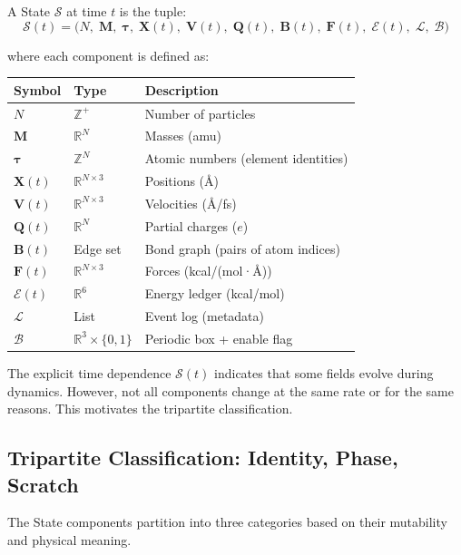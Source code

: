 \documentclass[11pt]{article}
\begin{document}
A State $\mathcal{S}$ at time $t$ is the tuple:
\begin{equation}
\mathcal{S}(t) = \bigl(N, \; \mathbf{M}, \; \boldsymbol{\tau}, \; \mathbf{X}(t), \; \mathbf{V}(t), \; \mathbf{Q}(t), \; \mathbf{B}(t), \; \mathbf{F}(t), \; \mathcal{E}(t), \; \mathcal{L}, \; \mathcal{B}\bigr)
\end{equation}

where each component is defined as:

\begin{center}
\begin{tabular}{lll}
\toprule
Symbol & Type & Description \\
\midrule
$N$ & $\mathbb{Z}^+$ & Number of particles \\
$\mathbf{M}$ & $\mathbb{R}^N$ & Masses (amu) \\
$\boldsymbol{\tau}$ & $\mathbb{Z}^N$ & Atomic numbers (element identities) \\
$\mathbf{X}(t)$ & $\mathbb{R}^{N \times 3}$ & Positions (\AA) \\
$\mathbf{V}(t)$ & $\mathbb{R}^{N \times 3}$ & Velocities (\AA/fs) \\
$\mathbf{Q}(t)$ & $\mathbb{R}^N$ & Partial charges ($e$) \\
$\mathbf{B}(t)$ & Edge set & Bond graph (pairs of atom indices) \\
$\mathbf{F}(t)$ & $\mathbb{R}^{N \times 3}$ & Forces (kcal/(mol·\AA)) \\
$\mathcal{E}(t)$ & $\mathbb{R}^6$ & Energy ledger (kcal/mol) \\
$\mathcal{L}$ & List & Event log (metadata) \\
$\mathcal{B}$ & $\mathbb{R}^3 \times \{0,1\}$ & Periodic box + enable flag \\
\bottomrule
\end{tabular}
\end{center}

The explicit time dependence $\mathcal{S}(t)$ indicates that some fields evolve during dynamics. However, not all components change at the same rate or for the same reasons. This motivates the tripartite classification.

\subsection{Tripartite Classification: Identity, Phase, Scratch}

The State components partition into three categories based on their mutability and physical meaning.
\end{document}
